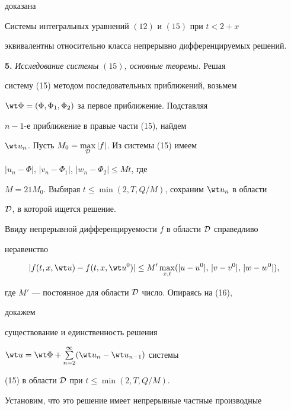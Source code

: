 доказана 


 


\begin{thm} 


Системы интегральных уравнений $(12)$ и $(15)$ при $t<2+x$ 


эквивалентны относительно класса непрерывно дифференцируемых решений. 


\end{thm} 


 


{\bf 5.} {\it Исследование системы $(15)$, основные теоремы.} Решая 


систему (15) методом последовательных приближений, возьмем 


$\wt\Phi=(\Phi,\Phi_1,\Phi_2)$ за первое приближение. Подставляя 


$n{-}1$-е приближение в правые части (15), найдем 


$\wt u_n$. Пусть $M_0=\max\limits_{\cal D}|f|$. Из системы (15) имеем 


$|u_n-\Phi|$, $|v_n-\Phi_1|$, $|w_n-\Phi_2|\le M t$, где 


$M=21M_0$. Выбирая $t\le\min(2,T,Q/M)$, сохраним $\wt u_n$ в области 


$\cal D$, в которой ищется решение. 


 


Ввиду непрерывной дифференцируемости $f$ в области $\cal D$ справедливо 


неравенство 


\begin{equation} 


|f(t,x,\wt u)-f(t,x,\wt u^0)|\le M'\max_{x,t} 


(|u-u^0|,\,|v-v^0|,\,|w-w^0|), 


\end{equation} 


где $M'$ --- постоянное для области $\cal D$ число. Опираясь на (16), 


докажем 


существование и единственность решения 


$\wt u=\wt\Phi+\sum\limits^\infty_{n=2}(\wt u_n-\wt u_{n-1})$ системы 


(15) в области $\cal D$ при $t\le\min(2,T,Q/M)$. 


 


Установим, что это решение имеет непрерывные частные производные 


